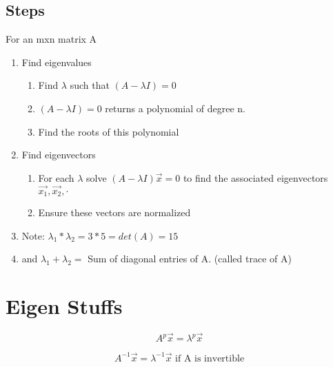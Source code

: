 \documentclass[12pt]{amsart}
\numberwithin{equation}{theorem}    %
\begin{document}
\subsection{Steps}
For an mxn matrix A
\begin{enumerate}
    \item Find eigenvalues
          \begin{enumerate}
              \item Find $\lambda$ such that $(A-\lambda I) = 0$
              \item $(A-\lambda I) = 0$ returns a polynomial of degree n.
              \item Find the roots of this polynomial
          \end{enumerate}
    \item Find eigenvectors
          \begin{enumerate}
              \item For each $\lambda$ solve $(A-\lambda I)\vec{x} = 0$ to find the associated eigenvectors $\vec{x_1}, \vec{x_2}, \cdot$
              \item Ensure these vectors are normalized
          \end{enumerate}
    \item Note: $\lambda_1 * \lambda_2 = 3*5 = det(A) = 15$
    \item and $\lambda_1 + \lambda_2 =$ Sum of diagonal entries of A. (called trace of A)
\end{enumerate}

\section{Eigen Stuffs}

\begin{equation}
    A^p \vec{x} = \lambda^p \vec{x}
\end{equation}


\begin{equation}
    A^{-1} \vec{x} = \lambda^{-1} \vec{x} \text{ if A is invertible}
\end{equation}
\end{document}
